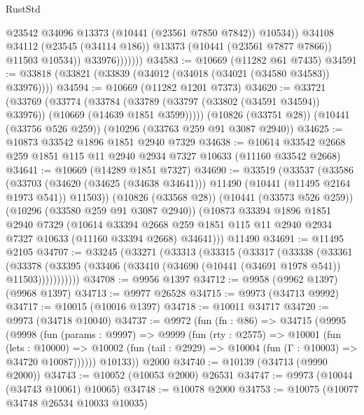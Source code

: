 \begin{lexlean}{RustStd}
\begin{coremodule}
                          @23542
                          @34096
                          @13373
                          (@10441 (@23561 @7850 @7842))
                          @10534))
                      @34108
                      @34112
                      (@23545 (@34114 @186))
                      @13373
                      (@10441 (@23561 @7877 @7866))
                      @11503
                      @10534))
                  @33976)))))))
@34583 := @10669 (@11282 @61 @7435)
@34591 := @33818 (@33821 (@33839 (@34012 (@34018 (@34021 (@34580 @34583)) @33976))))
@34594 := @10669 (@11282 @1201 @7373)
@34620 := @33721
    (@33769
      (@33774
        (@33784 (@33789 (@33797 (@33802 (@34591 @34594)) @33976)) (@10669 (@14639 @1851 @3599)))))
    (@10826 (@33751 @28))
    (@10441 (@33756 @526 @259))
    (@10296 (@33763 @259 @91 @3087 @2940))
@34625 := @10873 @33542 @1896 @1851 @2940 @7329
@34638 := @10614 @33542 @2668 @259 @1851 @115 @11 @2940 @2934 @7327 @10633 (@11160 @33542 @2668)
@34641 := @10669 (@14289 @1851 @7327)
@34690 := @33519
    (@33537
      (@33586
        (@33703 (@34620 (@34625 (@34638 @34641))) @11490 (@10441 (@11495 @2164 @1973 @541)) @11503))
      (@10826 (@33568 @28))
      (@10441 (@33573 @526 @259))
      (@10296 (@33580 @259 @91 @3087 @2940))
      (@10873
        @33394
        @1896
        @1851
        @2940
        @7329
        (@10614
          @33394
          @2668
          @259
          @1851
          @115
          @11
          @2940
          @2934
          @7327
          @10633
          (@11160 @33394 @2668)
          @34641)))
    @11490
@34691 := @11495 @2105
@34707 := @33245
    (@33271
      (@33313
        (@33315
          (@33317
            (@33338
              (@33361
                (@33378
                  (@33395 (@33406 (@33410 (@34690 (@10441 (@34691 @1978 @541)) @11503)))))))))))
@34708 := @9956 @1397
@34712 := @9958 (@9962 @1397) (@9968 @1397)
@34713 := @9977 @26528
@34715 := @9973 (@34713 @9992)
@34717 := @10015 (@10016 @1397)
@34718 := @10011 @34717
@34720 := @9973 (@34718 @10040)
@34737 := @9972
    (fun (fn : @86) =>
    @34715
      (@9995
        (@9998
          (fun (params : @9997) =>
          @9999
            (fun (rty : @2575) =>
            @10001
              (fun (lets : @10000) =>
              @10002 (fun (tail : @2929) => @10004 (fun (Γ : @10003) => @34720 @10087))))))
        @10133))
    @2000
@34740 := @10139 (@34713 (@9990 @2000))
@34743 := @10052 (@10053 @2000) @26531
@34747 := @9973 (@10044 (@34743 @10061) @10065)
@34748 := @10078 @2000
@34753 := @10075 (@10077 @34748 @26534 @10033 @10035)

\end{coremodule}
\end{lexlean}
